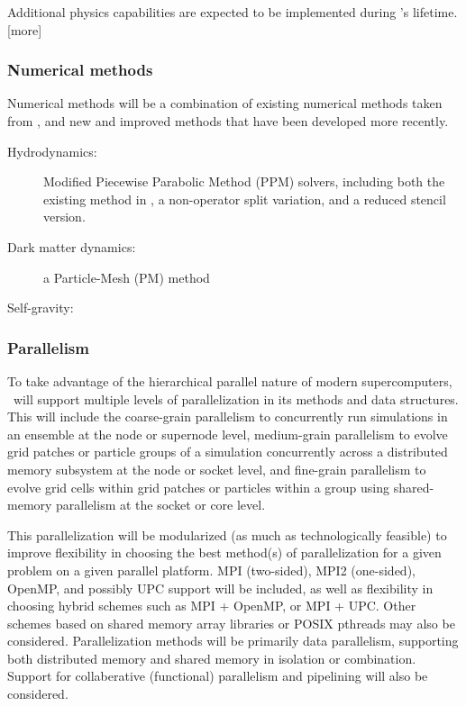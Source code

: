 \documentclass[11pt]{article}
\begin{document}
    Additional physics capabilities are expected to be implemented
    during \cello's lifetime.  [more]

    \subsubsection{Numerical methods}

    Numerical methods will be a combination of existing numerical
    methods taken from \enzo, and new and improved methods that
    have been developed more recently.

    \begin{description}
% 
    \item[Hydrodynamics: ] Modified Piecewise Parabolic Method (PPM)
    solvers, including both the existing method in \enzo, a
    non-operator split variation, and a reduced stencil version.
%
    \item[Dark matter dynamics: ] a Particle-Mesh (PM) method
%
    \item[Self-gravity: ]  
    \end{description}

    \subsubsection{Parallelism} 


    To take advantage of the hierarchical parallel nature of modern
    supercomputers, \cello\ will support multiple levels of
    parallelization in its methods and data structures.  This will
    include the coarse-grain parallelism to concurrently run
    simulations in an ensemble at the node or supernode level,
    medium-grain parallelism to evolve grid patches or particle groups
    of a simulation concurrently across a distributed memory subsystem
    at the node or socket level, and fine-grain parallelism to evolve
    grid cells within grid patches or particles within a group using
    shared-memory parallelism at the socket or core level.


    This parallelization will be modularized (as much as
    technologically feasible) to improve flexibility in choosing the
    best method(s) of parallelization for a given problem on a given
    parallel platform.  MPI (two-sided), MPI2 (one-sided), OpenMP, and
    possibly UPC support will be included, as well as flexibility in
    choosing hybrid schemes such as MPI + OpenMP, or MPI + UPC.  Other
    schemes based on shared memory array libraries or POSIX pthreads
    may also be considered.  Parallelization methods will be primarily
    data parallelism, supporting both distributed memory and shared
    memory in isolation or combination.  Support for collaberative
    (functional) parallelism and pipelining will also be considered.
\end{document}
